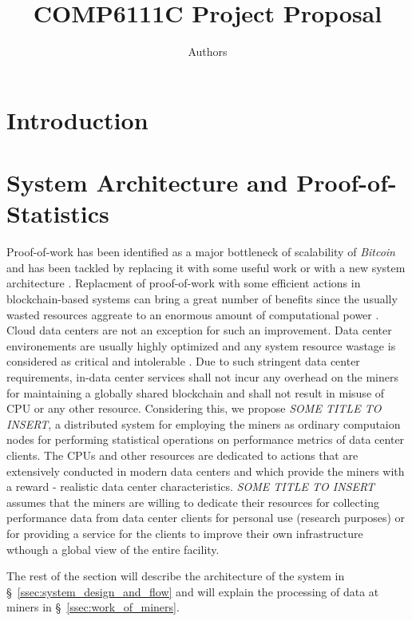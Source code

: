 \documentclass{article}
\title{COMP6111C Project Proposal}
\author{Authors}
\date{}
\newcommand{\projTitle}{SOME TITLE TO INSERT}
\begin{document}
\maketitle


\section{Introduction}


\section{System Architecture and Proof-of-Statistics}
Proof-of-work has been identified as a major bottleneck of scalability of \textit{Bitcoin}  and has been tackled by replacing it with some useful work \cite{filecoin-storage} or with a new system architecture \cite{RSCoin-bank}.  Replacment of proof-of-work with some  
efficient actions in blockchain-based systems can bring a great number of benefits since the usually wasted resources aggreate to an enormous amount of  computational power \cite{bitcoin-comp-elec-power}. Cloud data centers are not an exception for such an 
improvement. Data center environements are usually highly optimized and any system resource wastage is considered as critical and intolerable \cite{google-ai-power, facebook-cold-storage-rack}. Due to such stringent data center requirements, in-data center services
shall not incur any overhead on the miners for maintaining a globally shared blockchain and shall not result in misuse of CPU or any other resource. Considering this, we propose \textit{\projTitle}, a distributed system for employing the miners as ordinary computaion nodes for performing statistical operations on performance metrics of data center clients. The CPUs and other resources are dedicated to actions that are extensively conducted in modern data centers \cite{microsoft-autopilot} and which provide the miners with a reward - realistic data center characteristics. \textit{\projTitle} assumes that the miners are willing to dedicate their resources for collecting performance data from data center clients for personal use (research purposes) or for providing a service for the clients to improve their own infrastructure wthough a global view of the entire facility.

The rest of the section will describe the architecture of the system in \S\ \ref{ssec:system_design_and_flow} and will explain
the processing of data at miners in \S\ \ref{ssec:work_of_miners}. 
\end{document}
